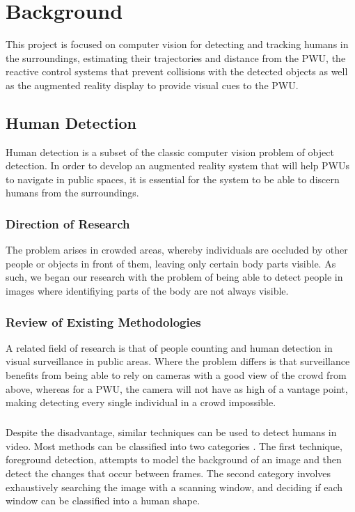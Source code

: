 \chapter{Background}
This project is focused on computer vision for detecting and tracking humans in the surroundings, estimating their trajectories and distance from the PWU, the reactive control systems that prevent collisions with the detected objects as well as the augmented reality display to provide visual cues to the PWU.

\section{Human Detection}
Human detection is a subset of the classic computer vision problem of object detection. In order to develop an augmented reality system that will help PWUs to navigate in public spaces, it is essential for the system to be able to discern humans from the surroundings.

\subsection{Direction of Research}
 The problem arises in crowded areas, whereby individuals are occluded by other people or objects in front of them, leaving only certain body parts visible. As such, we began our research with the problem of being able to detect people in images where identifiying parts of the body are not always visible.

\subsection{Review of Existing Methodologies}
A related field of research is that of people counting and human detection in visual surveillance in public areas. Where the problem differs is that surveillance benefits from being able to rely on cameras with a good view of the crowd from above, whereas for a PWU, the camera will not have as high of a vantage point, making detecting every single individual in a crowd impossible. 

\paragraph{} Despite the disadvantage, similar techniques can be used to detect humans in video. Most methods can be classified into two categories \cite{Hou2010}. The first technique, foreground detection, attempts to model the background of an image and then detect the changes that occur between frames. The second category involves exhaustively searching the image with a scanning window, and deciding if each window can be classified into a human shape.

